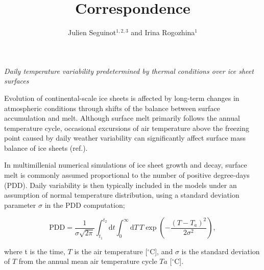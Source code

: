 \documentclass[review]{igs}
\begin{document}
\title[Correspondence]{Correspondence}
\author[Seguinot and Rogozhina]{Julien Seguinot$^{1,2,3}$ and Irina Rogozhina$^1$}

\maketitle


\emph{Daily temperature variability predetermined by thermal conditions over ice sheet surfaces}

Evolution of continental-scale ice sheets is affected by long-term changes in atmospheric conditions through shifts of the balance between surface accumulation and melt. Although surface melt primarily follows the annual temperature cycle, occasional excursions of air temperature above the freezing point caused by daily weather variability can significantly affect surface mass balance of ice sheets (ref.).

In multimillenial numerical simulations of ice sheet growth and decay, surface melt is commonly assumed proportional to the number of positive degree-days (PDD). Daily variability is then typically included in the models under an assumption of normal temperature distribution, using a standard deviation parameter $\sigma$ in the PDD computation;

\begin{equation} \label{eq:reeh}
  \mathrm{PDD} = \frac{1}{\sigma\sqrt{2\pi}}
    \int_{t_1}^{t_2} \mathrm{d}t
    \int_{0}^{\infty} \mathrm{d}T \,
    T \exp\left({-\frac{(T-T_a)^2}{2\sigma^2}}\right),
\end{equation}

where t is the time, $T$ is the air temperature [$^\circ$C], and $\sigma$ is the standard deviation of $T$ from the annual mean air temperature cycle $Ta$ [$^\circ$C].
\end{document}
